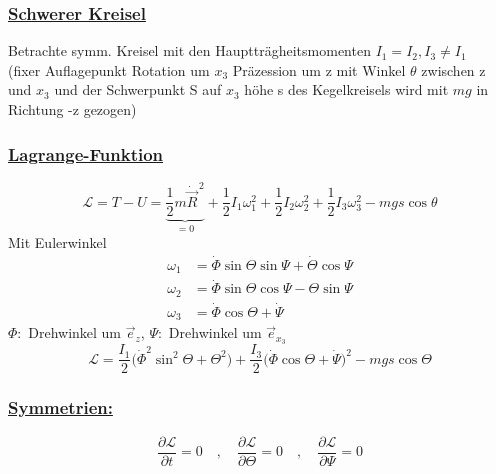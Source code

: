 \documentclass[titlepage,12pt,a4paper,ngerman]{report}
\newcommand{\ub}[1]{\underbrace{#1}}
\newcommand{\lag}{\mathcal{L}}
\begin{document}
{\subsubsection{\underline{Schwerer Kreisel}}
Betrachte symm. Kreisel mit den Hauptträgheitsmomenten $ I_1=I_2 , I_3 \neq I_1 $\\
(fixer Auflagepunkt Rotation um $ x_3 $ Präzession um z mit Winkel $ \theta $ zwischen z und $ x_3 $ und der Schwerpunkt S auf $ x_3 $ höhe s des Kegelkreisels wird mit $ mg $ in Richtung -z gezogen)\\
\subsubsection{\underline{Lagrange-Funktion}}
$$\lag = T-U = \ub{\frac{1}{2} m \dot{\vec{R}}^{\, 2}}_{=0} + \frac{1}{2} I_1 \omega_1^2 + \frac{1}{2} I_2 \omega_2^2 + \frac{1}{2} I_3 \omega_3^2 - mg s \cos \theta$$
Mit Eulerwinkel 
\begin{align*}
\omega_1 &= \dot{\Phi} \sin \Theta \sin \Psi + \dot{ \Theta} \cos \Psi\\
\omega_2 &= \dot{\Phi} \sin \Theta \cos \Psi - \Theta \sin \Psi\\
\omega_3 &= \dot{\Phi} \cos \Theta + \dot{\Psi}
\end{align*}
$ \Phi: $ Drehwinkel um $ \vec{e}_z $, $ \Psi: $ Drehwinkel um $ \vec{e}_{x_3} $\\
\begin{equation*}
\lag = \frac{I_1}{2} \bigg( \dot{\Phi}^2 \sin ^2 \Theta + \Theta ^2 \bigg) + \frac{I_3}{2} \bigg( \dot{\Phi} \cos \Theta + \dot{\Psi}\bigg) ^2 - mgs \cos \Theta \tag{1}
\end{equation*}
\subsubsection{\underline{Symmetrien:}}
\begin{equation*}
\frac{\partial \lag}{\partial t} = 0 \quad , \quad \frac{\partial \lag}{\partial \Theta} = 0 \quad , \quad \frac{\partial \lag}{\partial \Psi} = 0
\end{equation*}
}
\end{document}
